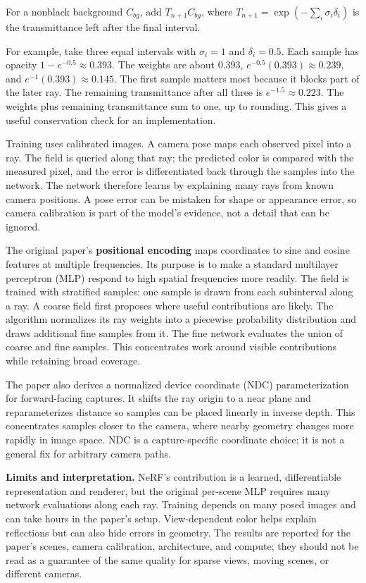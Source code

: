 For a nonblack background \(C_{bg}\), add \(T_{n+1}C_{bg}\), where \(T_{n+1}=\exp(-\sum_i\sigma_i\delta_i)\) is the transmittance left after the final interval.

For example, take three equal intervals with \(\sigma_i=1\) and \(\delta_i=0.5\). Each sample has opacity \(1-e^{-0.5}\approx0.393\). The weights are about \(0.393\), \(e^{-0.5}(0.393)\approx0.239\), and \(e^{-1}(0.393)\approx0.145\). The first sample matters most because it blocks part of the later ray. The remaining transmittance after all three is \(e^{-1.5}\approx0.223\). The weights plus remaining transmittance sum to one, up to rounding. This gives a useful conservation check for an implementation.

Training uses calibrated images. A camera pose maps each observed pixel into a ray. The field is queried along that ray; the predicted color is compared with the measured pixel, and the error is differentiated back through the samples into the network. The network therefore learns by explaining many rays from known camera positions. A pose error can be mistaken for shape or appearance error, so camera calibration is part of the model's evidence, not a detail that can be ignored.

The original paper's \textbf{positional encoding} maps coordinates to sine and cosine features at multiple frequencies. Its purpose is to make a standard multilayer perceptron (MLP) respond to high spatial frequencies more readily. The field is trained with stratified samples: one sample is drawn from each subinterval along a ray. A coarse field first proposes where useful contributions are likely. The algorithm normalizes its ray weights into a piecewise probability distribution and draws additional fine samples from it. The fine network evaluates the union of coarse and fine samples. This concentrates work around visible contributions while retaining broad coverage.

The paper also derives a normalized device coordinate (NDC) parameterization for forward-facing captures. It shifts the ray origin to a near plane and reparameterizes distance so samples can be placed linearly in inverse depth. This concentrates samples closer to the camera, where nearby geometry changes more rapidly in image space. NDC is a capture-specific coordinate choice; it is not a general fix for arbitrary camera paths.

\textbf{Limits and interpretation.} NeRF's contribution is a learned, differentiable representation and renderer, but the original per-scene MLP requires many network evaluations along each ray. Training depends on many posed images and can take hours in the paper's setup. View-dependent color helps explain reflections but can also hide errors in geometry. The results are reported for the paper's scenes, camera calibration, architecture, and compute; they should not be read as a guarantee of the same quality for sparse views, moving scenes, or different cameras.

